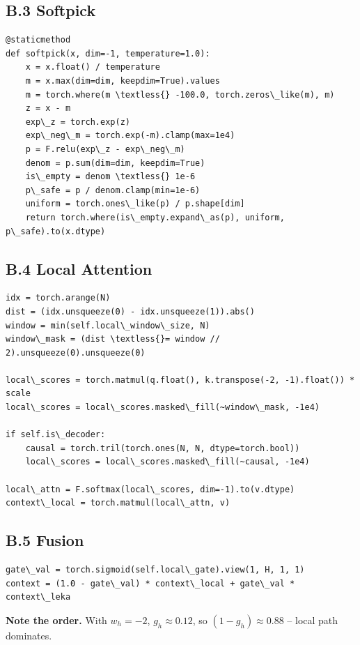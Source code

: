 \subsection{B.3 Softpick}

\begin{lstlisting}
@staticmethod
def softpick(x, dim=-1, temperature=1.0):
    x = x.float() / temperature
    m = x.max(dim=dim, keepdim=True).values
    m = torch.where(m \textless{} -100.0, torch.zeros\_like(m), m)
    z = x - m
    exp\_z = torch.exp(z)
    exp\_neg\_m = torch.exp(-m).clamp(max=1e4)
    p = F.relu(exp\_z - exp\_neg\_m)
    denom = p.sum(dim=dim, keepdim=True)
    is\_empty = denom \textless{} 1e-6
    p\_safe = p / denom.clamp(min=1e-6)
    uniform = torch.ones\_like(p) / p.shape[dim]
    return torch.where(is\_empty.expand\_as(p), uniform, p\_safe).to(x.dtype)
\end{lstlisting}

\subsection{B.4 Local Attention}

\begin{lstlisting}
idx = torch.arange(N)
dist = (idx.unsqueeze(0) - idx.unsqueeze(1)).abs()
window = min(self.local\_window\_size, N)
window\_mask = (dist \textless{}= window // 2).unsqueeze(0).unsqueeze(0)

local\_scores = torch.matmul(q.float(), k.transpose(-2, -1).float()) * scale
local\_scores = local\_scores.masked\_fill(~window\_mask, -1e4)

if self.is\_decoder:
    causal = torch.tril(torch.ones(N, N, dtype=torch.bool))
    local\_scores = local\_scores.masked\_fill(~causal, -1e4)

local\_attn = F.softmax(local\_scores, dim=-1).to(v.dtype)
context\_local = torch.matmul(local\_attn, v)
\end{lstlisting}

\subsection{B.5 Fusion}

\begin{lstlisting}
gate\_val = torch.sigmoid(self.local\_gate).view(1, H, 1, 1)
context = (1.0 - gate\_val) * context\_local + gate\_val * context\_leka
\end{lstlisting}

\textbf{Note the order.} With $w_h = -2$, $g_h \approx 0.12$, so $(1-g_h) \approx 0.88$ -- local path dominates.

